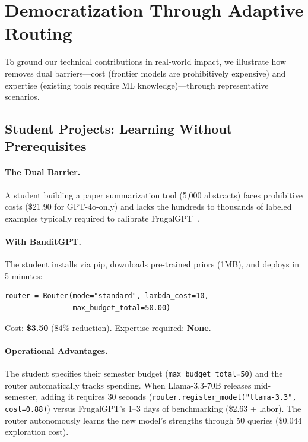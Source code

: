
\section{Democratization Through Adaptive Routing}
\label{sec:use_cases}

To ground our technical contributions in real-world impact, we illustrate how \ours{} removes dual barriers---cost (frontier models are prohibitively expensive) and expertise (existing tools require ML knowledge)---through representative scenarios.

\subsection{Student Projects: Learning Without Prerequisites}

\paragraph{The Dual Barrier.} A student building a paper summarization tool (5,000 abstracts) faces prohibitive costs (\$21.90 for GPT-4o-only) and lacks the hundreds to thousands of labeled examples typically required to calibrate FrugalGPT~\cite{chen2023frugalgpt}.

\paragraph{With BanditGPT.} The student installs via pip, downloads pre-trained priors (1MB), and deploys in 5 minutes:

\begin{small}
\begin{verbatim}
router = Router(mode="standard", lambda_cost=10,
                max_budget_total=50.00)
\end{verbatim}
\end{small}

\noindent Cost: \textbf{\$3.50} (84\% reduction). Expertise required: \textbf{None}.

\paragraph{Operational Advantages.} The student specifies their semester budget (\texttt{max\_budget\_total=50}) and the router automatically tracks spending. When Llama-3.3-70B releases mid-semester, adding it requires 30 seconds (\texttt{router.register\_model("llama-3.3", cost=0.88)}) versus FrugalGPT's 1--3 days of benchmarking (\$2.63 + labor). The router autonomously learns the new model's strengths through 50 queries (\$0.044 exploration cost).

